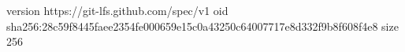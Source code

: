 version https://git-lfs.github.com/spec/v1
oid sha256:28c59f8445faee2354fe000659e15c0a43250c64007717e8d332f9b8f608f4e8
size 256
